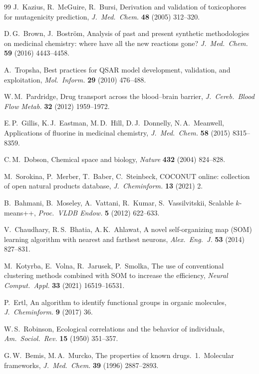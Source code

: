 \documentclass[10pt,a4paper,twocolumn]{article}
\begin{document}
\begin{thebibliography}{99}
J.~Kazius, R.~McGuire, R.~Bursi,
Derivation and validation of toxicophores for mutagenicity prediction,
\textit{J.\ Med.\ Chem.} \textbf{48} (2005) 312--320.

D.\,G.~Brown, J.~Bostr{\"o}m,
Analysis of past and present synthetic methodologies on medicinal chemistry: where have all the new reactions gone?
\textit{J.\ Med.\ Chem.} \textbf{59} (2016) 4443--4458.

A.~Tropsha,
Best practices for QSAR model development, validation, and exploitation,
\textit{Mol.\ Inform.} \textbf{29} (2010) 476--488.

W.\,M.~Pardridge,
Drug transport across the blood--brain barrier,
\textit{J.\ Cereb.\ Blood Flow Metab.} \textbf{32} (2012) 1959--1972.

E.\,P.~Gillis, K.\,J.~Eastman, M.\,D.~Hill, D.\,J.~Donnelly, N.\,A.~Meanwell,
Applications of fluorine in medicinal chemistry,
\textit{J.\ Med.\ Chem.} \textbf{58} (2015) 8315--8359.

C.\,M.~Dobson,
Chemical space and biology,
\textit{Nature} \textbf{432} (2004) 824--828.

M.~Sorokina, P.~Merber, T.~Baber, C.~Steinbeck,
COCONUT online: collection of open natural products database,
\textit{J.\ Cheminform.} \textbf{13} (2021) 2.

B.~Bahmani, B.~Moseley, A.~Vattani, R.~Kumar, S.~Vassilvitskii,
Scalable $k$-means++,
\textit{Proc.\ VLDB Endow.} \textbf{5} (2012) 622--633.

V.~Chaudhary, R.\,S.~Bhatia, A.\,K.~Ahlawat,
A novel self-organizing map (SOM) learning algorithm with nearest and farthest neurons,
\textit{Alex.\ Eng.\ J.} \textbf{53} (2014) 827--831.

M.~Kotyrba, E.~Volna, R.~Jarusek, P.~Smolka,
The use of conventional clustering methods combined with SOM to increase the efficiency,
\textit{Neural Comput.\ Appl.} \textbf{33} (2021) 16519--16531.

P.~Ertl,
An algorithm to identify functional groups in organic molecules,
\textit{J.\ Cheminform.} \textbf{9} (2017) 36.

W.\,S.~Robinson,
Ecological correlations and the behavior of individuals,
\textit{Am.\ Sociol.\ Rev.} \textbf{15} (1950) 351--357.

G.\,W.~Bemis, M.\,A.~Murcko,
The properties of known drugs.\ 1.\ Molecular frameworks,
\textit{J.\ Med.\ Chem.} \textbf{39} (1996) 2887--2893.


\end{thebibliography}
\end{document}
